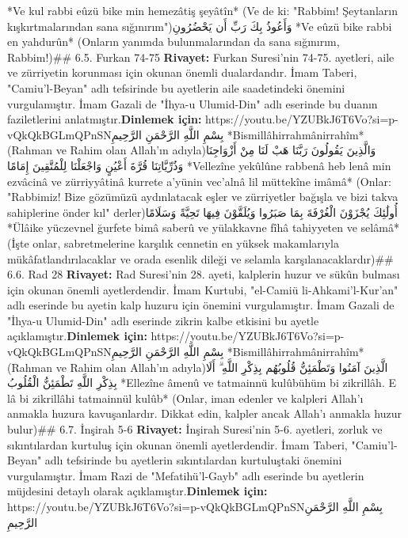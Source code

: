 \documentclass[12pt,a4paper]{article}
\begin{document}
{*Ve kul rabbi eûzü bike min hemezâtiş şeyâtîn*
(Ve de ki: "Rabbim! Şeytanların kışkırtmalarından sana sığınırım")وَأَعُوذُ بِكَ رَبِّ أَن يَحْضُرُونِ
*Ve eûzü bike rabbi en yahdurûn*
(Onların yanımda bulunmalarından da sana sığınırım, Rabbim!)\#\# 6.5. Furkan 74-75
\textbf{Rivayet:} Furkan Suresi'nin 74-75. ayetleri, aile ve zürriyetin korunması için okunan önemli dualardandır. İmam Taberi, "Camiu'l-Beyan" adlı tefsirinde bu ayetlerin aile saadetindeki önemini vurgulamıştır. İmam Gazali de "İhya-u Ulumid-Din" adlı eserinde bu duanın faziletlerini anlatmıştır.\textbf{Dinlemek için:} https://youtu.be/YZUBkJ6T6Vo?si=p-vQkQkBGLmQPnSNبِسْمِ اللَّهِ الرَّحْمَنِ الرَّحِيمِ
*Bismillâhirrahmânirrahîm*
(Rahman ve Rahim olan Allah'ın adıyla)وَالَّذِينَ يَقُولُونَ رَبَّنَا هَبْ لَنَا مِنْ أَزْوَاجِنَا وَذُرِّيَّاتِنَا قُرَّةَ أَعْيُنٍ وَاجْعَلْنَا لِلْمُتَّقِينَ إِمَامًا
*Vellezîne yekûlûne rabbenâ heb lenâ min ezvâcinâ ve zürriyyâtinâ kurrete a'yünin vec'alnâ lil müttekîne imâmâ*
(Onlar: "Rabbimiz! Bize gözümüzü aydınlatacak eşler ve zürriyetler bağışla ve bizi takva sahiplerine önder kıl" derler)أُولَٰئِكَ يُجْزَوْنَ الْغُرْفَةَ بِمَا صَبَرُوا وَيُلَقَّوْنَ فِيهَا تَحِيَّةً وَسَلَامًا
*Ülâike yüczevnel ğurfete bimâ saberû ve yülakkavne fîhâ tahiyyeten ve selâmâ*
(İşte onlar, sabretmelerine karşılık cennetin en yüksek makamlarıyla mükâfatlandırılacaklar ve orada esenlik dileği ve selamla karşılanacaklardır)\#\# 6.6. Rad 28
\textbf{Rivayet:} Rad Suresi'nin 28. ayeti, kalplerin huzur ve sükûn bulması için okunan önemli ayetlerdendir. İmam Kurtubi, "el-Camiü li-Ahkami'l-Kur'an" adlı eserinde bu ayetin kalp huzuru için önemini vurgulamıştır. İmam Gazali de "İhya-u Ulumid-Din" adlı eserinde zikrin kalbe etkisini bu ayetle açıklamıştır.\textbf{Dinlemek için:} https://youtu.be/YZUBkJ6T6Vo?si=p-vQkQkBGLmQPnSNبِسْمِ اللَّهِ الرَّحْمَنِ الرَّحِيمِ
*Bismillâhirrahmânirrahîm*
(Rahman ve Rahim olan Allah'ın adıyla)الَّذِينَ آمَنُوا وَتَطْمَئِنُّ قُلُوبُهُم بِذِكْرِ اللَّهِ ۗ أَلَا بِذِكْرِ اللَّهِ تَطْمَئِنُّ الْقُلُوبُ
*Ellezîne âmenû ve tatmainnü kulûbühüm bi zikrillâh. E lâ bi zikrillâhi tatmainnül kulûb*
(Onlar, iman edenler ve kalpleri Allah'ı anmakla huzura kavuşanlardır. Dikkat edin, kalpler ancak Allah'ı anmakla huzur bulur)\#\# 6.7. İnşirah 5-6
\textbf{Rivayet:} İnşirah Suresi'nin 5-6. ayetleri, zorluk ve sıkıntılardan kurtuluş için okunan önemli ayetlerdendir. İmam Taberi, "Camiu'l-Beyan" adlı tefsirinde bu ayetlerin sıkıntılardan kurtuluştaki önemini vurgulamıştır. İmam Razi de "Mefatihü'l-Gayb" adlı eserinde bu ayetlerin müjdesini detaylı olarak açıklamıştır.\textbf{Dinlemek için:} https://youtu.be/YZUBkJ6T6Vo?si=p-vQkQkBGLmQPnSNبِسْمِ اللَّهِ الرَّحْمَنِ الرَّحِيمِ
}
\end{document}

